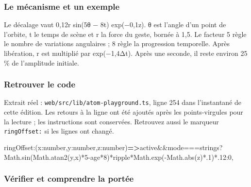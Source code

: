 \documentclass[
  canadien,
  11pt,
  letterpaper,
]{article}
\newenvironment{Shaded}{}{}
\newcommand{\BuiltInTok}[1]{\textcolor[rgb]{0.00,0.50,0.00}{#1}}
\newcommand{\DataTypeTok}[1]{\textcolor[rgb]{0.56,0.13,0.00}{#1}}
\newcommand{\DecValTok}[1]{\textcolor[rgb]{0.25,0.63,0.44}{#1}}
\newcommand{\FunctionTok}[1]{\textcolor[rgb]{0.02,0.16,0.49}{#1}}
\newcommand{\KeywordTok}[1]{\textcolor[rgb]{0.00,0.44,0.13}{\textbf{#1}}}
\newcommand{\NormalTok}[1]{#1}
\newcommand{\OperatorTok}[1]{\textcolor[rgb]{0.40,0.40,0.40}{#1}}
\newcommand{\StringTok}[1]{\textcolor[rgb]{0.25,0.44,0.63}{#1}}
\begin{document}
\subsubsection{Le mécanisme et un
exemple}\label{le-muxe9canisme-et-un-exemple-2}

Le décalage vaut 0,12r sin(5θ − 8t) exp(−0,1\textbar z\textbar). θ est
l'angle d'un point de l'orbite, t le temps de scène et r la force du
geste, bornée à 1,5. Le facteur 5 règle le nombre de variations
angulaires ; 8 règle la progression temporelle. Après libération, r est
multiplié par exp(−1,4Δt). Après une seconde, il reste environ 25 \% de
l'amplitude initiale.

\subsubsection{Retrouver le code}\label{retrouver-le-code-2}

Extrait réel : \texttt{web/src/lib/atom-playground.ts}, ligne 254 dans
l'instantané de cette édition. Les retours à la ligne ont été ajoutés
après les points-virgules pour la lecture ; les instructions sont
conservées. Retrouvez aussi le marqueur \texttt{ringOffset:} si les
lignes ont changé.

\begin{Shaded}
\begin{Highlighting}[]
\NormalTok{ringOffset}\OperatorTok{:}\NormalTok{(x}\OperatorTok{:}\DataTypeTok{number}\OperatorTok{,}\NormalTok{y}\OperatorTok{:}\DataTypeTok{number}\OperatorTok{,}\NormalTok{z}\OperatorTok{:}\DataTypeTok{number}\NormalTok{)}\KeywordTok{=\textgreater{}}\NormalTok{active}\OperatorTok{\&\&}\NormalTok{mode}\OperatorTok{===}\StringTok{\textquotesingle{}strings\textquotesingle{}}\OperatorTok{?}\BuiltInTok{Math}\OperatorTok{.}\FunctionTok{sin}\NormalTok{(}\BuiltInTok{Math}\OperatorTok{.}\FunctionTok{atan2}\NormalTok{(y}\OperatorTok{,}\NormalTok{x)}\OperatorTok{*}\DecValTok{5}\OperatorTok{{-}}\NormalTok{age}\OperatorTok{*}\DecValTok{8}\NormalTok{)}\OperatorTok{*}\NormalTok{ripple}\OperatorTok{*}\BuiltInTok{Math}\OperatorTok{.}\FunctionTok{exp}\NormalTok{(}\OperatorTok{{-}}\BuiltInTok{Math}\OperatorTok{.}\FunctionTok{abs}\NormalTok{(z)}\OperatorTok{*.}\DecValTok{1}\NormalTok{)}\OperatorTok{*.}\DecValTok{12}\OperatorTok{:}\DecValTok{0}\OperatorTok{,}
\end{Highlighting}
\end{Shaded}

\subsubsection{Vérifier et comprendre la
portée}\label{vuxe9rifier-et-comprendre-la-portuxe9e-2}
\end{document}
